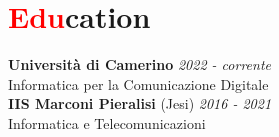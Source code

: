 \section*{\textcolor{red}{Edu}cation}
\large{\textbf{Università di Camerino}}
\hfill\textsl{2022 - corrente}\\[2mm]
Informatica per la Comunicazione Digitale\\[5mm]
\large{\textbf{IIS Marconi Pieralisi} (Jesi)}
\hfill\textsl{2016 - 2021}\\[2mm]
Informatica e Telecomunicazioni